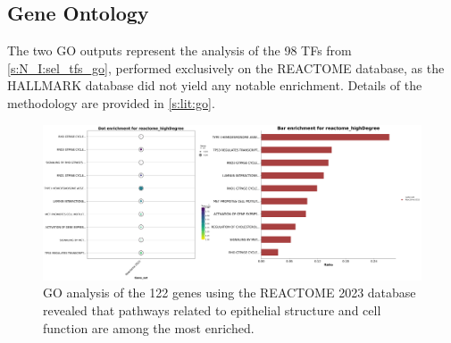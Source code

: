 \subsection{Gene Ontology} \label{s:ap:N_II:go}


The two GO outputs represent the analysis of the 98 TFs from \cref{s:N_I:sel_tfs_go}, performed exclusively on the REACTOME database, as the HALLMARK database did not yield any notable enrichment. Details of the methodology are provided in \cref{s:lit:go}.

\begin{figure}[!htb]
    \centering
    \includegraphics[width=1.0\textwidth,keepaspectratio]{Sections/Network_II/resources/reward/reactome_highDegree_dualPlot.png}
    \caption[GO analysis of the 122 genes querying REACTOME]{GO analysis of the 122 genes using the REACTOME 2023 database revealed that pathways related to epithelial structure and cell function are among the most enriched.}
    \label{fig:ap:N_II:reactome}
\end{figure}